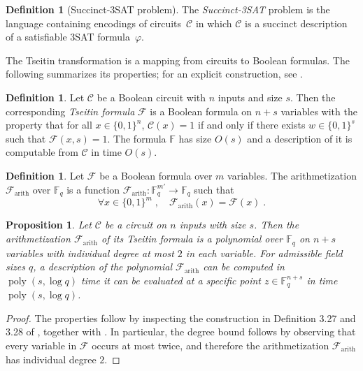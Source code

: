 \documentclass[11pt]{article}
\newtheorem{proposition}[theorem]{Proposition}
\theoremstyle{definition}
\newtheorem{definition}[theorem]{Definition}
\newcommand{\F}{\ensuremath{\mathbb{F}}}
\DeclareMathOperator{\poly}{poly}
\newcommand{\circuit}{\mathcal{C}}
\newcommand{\formula}{\mathcal{F}}
\begin{document}
\begin{definition}[Succinct-3SAT problem]
  The \emph{Succinct-3SAT} problem is the language containing encodings of
  circuits~$\circuit$ in which $\circuit$ is a succinct description of a
  satisfiable 3SAT formula~$\varphi$.
\end{definition}



The Tseitin transformation is a mapping from circuits to Boolean
formulas. The following summarizes its properties; for an explicit
construction, see \cite[Section 3.8]{NW19}.
\begin{definition}
  \label{def:tseitin}
  Let $\circuit$ be a Boolean circuit with $n$ inputs and size $s$. Then the corresponding \emph{Tseitin formula} $\formula$ is a
  Boolean formula on $n+s$ variables with the property that for all $x
  \in \{0,1\}^n$, $\circuit(x) = 1$ if and only if there exists $w \in
\{0,1\}^s$ such that $\formula(x, s) = 1$. The formula $\F$ has size
$O(s)$ and a description of it is computable from $\circuit$ in time $O(s)$.
\end{definition}

\begin{definition}
  \label{def:formula-arithmetization}
  Let $\formula$ be a Boolean formula over $m$ variables. The arithmetization
  $\formula_{\mathrm{arith}}$ over $\F_q$ is a function
  $\formula_{\mathrm{arith}}:\F_q^{m'}\rightarrow \F_q$ such that
  \begin{equation}
    \label{eq:farith}
    \forall x \in \{0, 1\}^{m}\;,
    \quad \formula_{\mathrm{arith}}(x) = \formula(x)\;.
  \end{equation}
  
\end{definition}

\begin{proposition}
  \label{prop:tseitin-arith-degree}
  Let $\circuit$ be a circuit on $n$ inputs with size $s$. Then the
  arithmetization $\formula_{\mathrm{arith}}$ of its Tseitin formula
  is a polynomial over $\F_q$ on $n +s$ variables with individual
  degree at most $2$ in each variable. For admissible field sizes $q$,
  a description of the polynomial
  $\formula_{\mathrm{arith}}$ can be computed in $\poly(s, \log q)$ time
  it can be evaluated at a specific point $z \in \F_q^{n+s}$ in time
  $\poly(s, \log q)$.
\end{proposition}
\begin{proof}
    The properties follow by inspecting the construction in Definition
    3.27 and 3.28 of \cite{NW19}, together with
    . In particular, the degree bound
    follows by observing that every variable in
    $\formula$ occurs at most twice, and therefore the arithmetization
    $\formula_{\mathrm{arith}}$ has individual degree $2$.
\end{proof}
\end{document}
